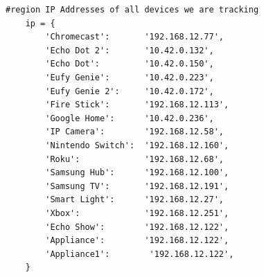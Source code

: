 \begin{minipage}{\textwidth}
    \begin{lstlisting}[label={lst:ipLookup},caption={IP lookup table in real time IoT grapher.}]
    #region IP Addresses of all devices we are tracking
    ip = {
        'Chromecast':       '192.168.12.77',
        'Echo Dot 2':       '10.42.0.132',
        'Echo Dot':         '10.42.0.150',
        'Eufy Genie':       '10.42.0.223',
        'Eufy Genie 2':     '10.42.0.172',
        'Fire Stick':       '192.168.12.113',
        'Google Home':      '10.42.0.236',
        'IP Camera':        '192.168.12.58',
        'Nintendo Switch':  '192.168.12.160',
        'Roku':             '192.168.12.68',
        'Samsung Hub':      '192.168.12.100',
        'Samsung TV':       '192.168.12.191',
        'Smart Light':      '192.168.12.27',
        'Xbox':             '192.168.12.251',
        'Echo Show':        '192.168.12.122',
        'Appliance':        '192.168.12.122',
        'Appliance1':        '192.168.12.122',
    }
    \end{lstlisting}
\end{minipage}
